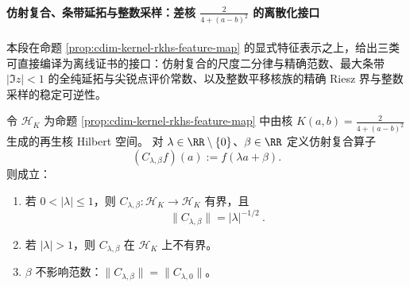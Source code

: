 \paragraph{仿射复合、条带延拓与整数采样：差核 \texorpdfstring{$\frac{2}{4+(a-b)^2}$}{2/(4+(a-b)^2)} 的离散化接口}
本段在命题 \ref{prop:cdim-kernel-rkhs-feature-map} 的显式特征表示之上，给出三类可直接编译为离线证书的接口：仿射复合的尺度二分律与精确范数、最大条带 \(|\Im z|<1\) 的全纯延拓与尖锐点评价常数、以及整数平移核族的精确 Riesz 界与整数采样的稳定可逆性。

\begin{proposition}[仿射复合算子的尺度二分律与精确范数]\label{prop:cdim-kernel-affine-composition-norm}
令 \(\mathcal H_K\) 为命题 \ref{prop:cdim-kernel-rkhs-feature-map} 中由核
\(
K(a,b)=\frac{2}{4+(a-b)^2}
\)
生成的再生核 Hilbert 空间。
对 \(\lambda\in\RR\setminus\{0\}\)、\(\beta\in\RR\) 定义仿射复合算子
\[
(C_{\lambda,\beta}f)(a):=f(\lambda a+\beta).
\]
则成立：
\begin{enumerate}
  \item 若 \(0<|\lambda|\le 1\)，则 \(C_{\lambda,\beta}:\mathcal H_K\to\mathcal H_K\) 有界，且
  \[
  \boxed{\ \|C_{\lambda,\beta}\|=|\lambda|^{-1/2}\ }.
  \]
  \item 若 \(|\lambda|>1\)，则 \(C_{\lambda,\beta}\) 在 \(\mathcal H_K\) 上不有界。
  \item \(\beta\) 不影响范数：\(\|C_{\lambda,\beta}\|=\|C_{\lambda,0}\|\)。
\end{enumerate}
\end{proposition}
